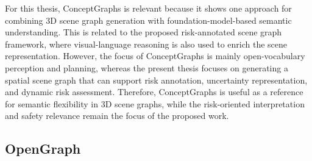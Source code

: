 {For this thesis, ConceptGraphs is relevant because it shows one approach for combining 3D scene graph generation with foundation-model-based semantic understanding. This is related to the proposed risk-annotated scene graph framework, where visual-language reasoning is also used to enrich the scene representation. However, the focus of ConceptGraphs is mainly open-vocabulary perception and planning, whereas the present thesis focuses on generating a spatial scene graph that can support risk annotation, uncertainty representation, and dynamic risk assessment. Therefore, ConceptGraphs is useful as a reference for semantic flexibility in 3D scene graphs, while the risk-oriented interpretation and safety relevance remain the focus of the proposed work.

}

\subsection{OpenGraph}

